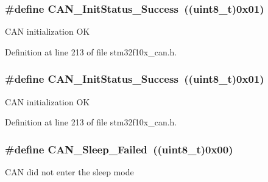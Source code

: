 \subsubsection[{\texorpdfstring{C\+A\+N\+\_\+\+Init\+Status\+\_\+\+Success}{CAN_InitStatus_Success}}]{\setlength{\rightskip}{0pt plus 5cm}\#define C\+A\+N\+\_\+\+Init\+Status\+\_\+\+Success~(({\bf uint8\+\_\+t})0x01)}\hypertarget{group___c_a_n__sleep__constants_ga6bed5957af8f2f6b00568e15ccac5772}{}\label{group___c_a_n__sleep__constants_ga6bed5957af8f2f6b00568e15ccac5772}
C\+AN initialization OK 

Definition at line 213 of file stm32f10x\+\_\+can.\+h.

\subsubsection[{\texorpdfstring{C\+A\+N\+\_\+\+Init\+Status\+\_\+\+Success}{CAN_InitStatus_Success}}]{\setlength{\rightskip}{0pt plus 5cm}\#define C\+A\+N\+\_\+\+Init\+Status\+\_\+\+Success~(({\bf uint8\+\_\+t})0x01)}\hypertarget{group___c_a_n__sleep__constants_ga6bed5957af8f2f6b00568e15ccac5772}{}\label{group___c_a_n__sleep__constants_ga6bed5957af8f2f6b00568e15ccac5772}
C\+AN initialization OK 

Definition at line 213 of file stm32f10x\+\_\+can.\+h.

\subsubsection[{\texorpdfstring{C\+A\+N\+\_\+\+Sleep\+\_\+\+Failed}{CAN_Sleep_Failed}}]{\setlength{\rightskip}{0pt plus 5cm}\#define C\+A\+N\+\_\+\+Sleep\+\_\+\+Failed~(({\bf uint8\+\_\+t})0x00)}\hypertarget{group___c_a_n__sleep__constants_ga169500ab7169c4e9c7e9e4ea34b3e070}{}\label{group___c_a_n__sleep__constants_ga169500ab7169c4e9c7e9e4ea34b3e070}
C\+AN did not enter the sleep mode 

